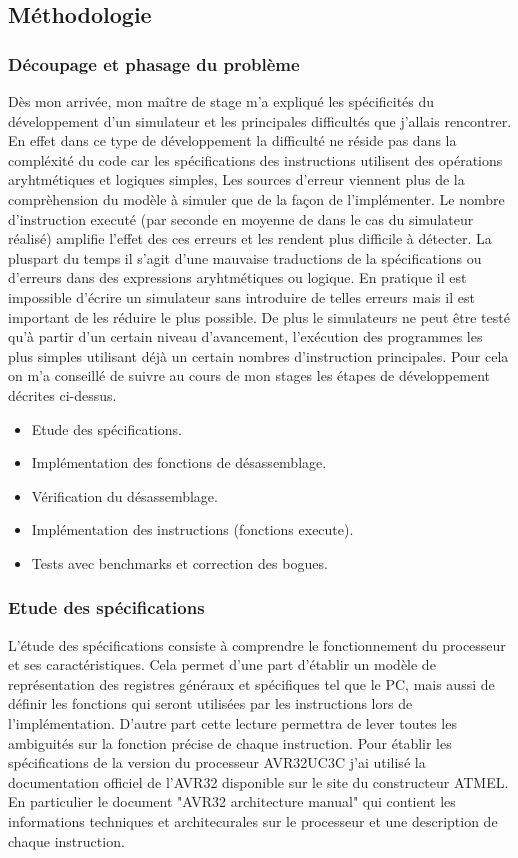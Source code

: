 \subsection{Méthodologie}

\subsubsection{Découpage et phasage du problème}
Dès mon arrivée, mon maître de stage m'a expliqué les spécificités du développement d'un simulateur et les principales difficultés que j'allais rencontrer. 
En effet dans ce type de développement la difficulté ne réside pas dans la compléxité du code car les spécifications des instructions utilisent des opérations aryhtmétiques et logiques simples,
Les sources d'erreur viennent plus de la comprèhension du modèle à simuler que de la façon de l'implémenter.
Le nombre d'instruction executé (par seconde en moyenne de dans le cas du simulateur réalisé) amplifie l'effet des ces erreurs et les rendent plus difficile à détecter. 
La pluspart du temps il s'agit d'une mauvaise traductions de la spécifications ou d'erreurs dans des expressions aryhtmétiques ou logique. 
En pratique il est impossible d'écrire un simulateur sans introduire de telles erreurs mais il est important de les réduire le plus possible. 
De plus le simulateurs ne peut être testé qu'à partir d'un certain niveau d'avancement, l'exécution des programmes les plus simples utilisant déjà un certain nombres d'instruction principales.
Pour cela on m'a conseillé de suivre au cours de mon stages les étapes de développement décrites ci-dessus.

\begin{itemize}
\item Etude des spécifications.
\item Implémentation des fonctions de désassemblage.
\item Vérification du désassemblage.
\item Implémentation des instructions (fonctions execute).
\item Tests avec benchmarks et correction des bogues.
\end{itemize}

\subsubsection{Etude des spécifications}

L'étude des spécifications consiste à comprendre le fonctionnement du processeur et ses caractéristiques. 
Cela permet d'une part d'établir un modèle de représentation des registres généraux et spécifiques tel que le PC, mais aussi de définir les fonctions qui seront utilisées par les instructions lors de l'implémentation. 
D'autre part cette lecture permettra de lever toutes les ambiguités sur la fonction précise de chaque instruction.
Pour établir les spécifications de la version du processeur AVR32UC3C j'ai utilisé la documentation officiel de l'AVR32 disponible sur le site du constructeur ATMEL.
En particulier le document "AVR32 architecture manual" qui contient les informations techniques et architecurales sur le processeur et une description de chaque instruction.
 
